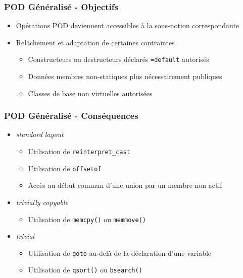 \documentclass[C++.tex]{subfiles}
\begin{document}
\begin{frame}[fragile]
	\frametitle{POD Généralisé - Objectifs}
	\begin{itemize}
		\item Opérations POD deviennent accessibles à la sous-notion correspondante
		\item Relâchement et adaptation de certaines contraintes
		\begin{itemize}
			\item Constructeurs ou destructeurs déclarés \lstinline|=default| autorisés
			\item Données membres non-statiques plus nécessairement publiques


			\item Classes de base non virtuelles autorisées

		\end{itemize}
	\end{itemize}
\end{frame}

\begin{frame}[fragile]
	\frametitle{POD Généralisé - Conséquences}
	\begin{itemize}
		\item \textit{standard layout}
		\begin{itemize}
			\item Utilisation de \lstinline|reinterpret_cast|
			\item Utilisation de \lstinline|offsetof|
			\item Accès au début commun d'une union par un membre non actif
		\end{itemize}
	
		\item \textit{trivially copyable}
		\begin{itemize}
			\item Utilisation de \lstinline|memcpy()| ou \lstinline|memmove()|
		\end{itemize}

		\item \textit{trivial}
		\begin{itemize}
			\item Utilisation de \lstinline|goto| au-delà de la déclaration d'une variable
			\item Utilisation de \lstinline|qsort()| ou \lstinline|bsearch()|
		\end{itemize}
	\end{itemize}
\end{frame}
\end{document}
